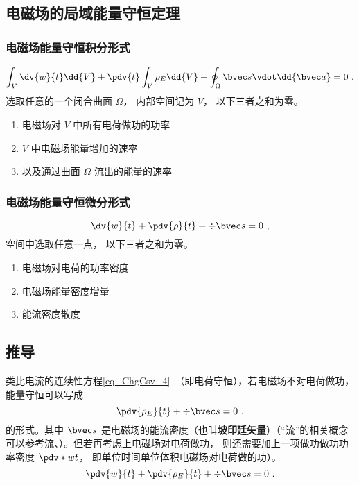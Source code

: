 \subsection{电磁场的局域能量守恒定理}

\subsubsection{电磁场能量守恒积分形式}
\begin{equation}
\int_V \dv{w}{t} \dd{V}  + \pdv{t} \int_V \rho_E \dd{V}  + \oint_\Omega  \bvec s \vdot \dd{\bvec a}  = 0~.
\end{equation} 
选取任意的一个闭合曲面 $\Omega $， 内部空间记为 $V$， 以下三者之和为零。
\begin{enumerate}
\item 电磁场对 $V$ 中所有电荷做功的功率
\item $V$ 中电磁场能量增加的速率
\item 以及通过曲面 $\Omega $ 流出的能量的速率
\end{enumerate}

\subsubsection{电磁场能量守恒微分形式}
\begin{equation}
\dv{w}{t} + \pdv{\rho}{t} + \div \bvec s = 0~,
\end{equation} 
空间中选取任意一点， 以下三者之和为零。
\begin{enumerate}
\item 电磁场对电荷的功率密度
\item 电磁场能量密度增量
\item 能流密度散度
\end{enumerate}

\subsection{推导}
类比电流的连续性方程\autoref{eq_ChgCsv_4}~（即电荷守恒），若电磁场不对电荷做功，能量守恒可以写成
\begin{equation}
\pdv{\rho_E}{t} + \div \bvec s = 0~.
\end{equation} 
的形式。其中 $\bvec s$ 是电磁场的能流密度（也叫\textbf{坡印廷矢量}）（“流”的相关概念可以参考流、）。但若再考虑上电磁场对电荷做功， 则还需要加上一项做功做功功率密度 $\pdv*{w}{t}$， 即单位时间单位体积电磁场对电荷做的功）。
\begin{equation}\label{eq_EBS_1}
\pdv{w}{t} + \pdv{\rho_E}{t} + \div \bvec s = 0~.
\end{equation} 

